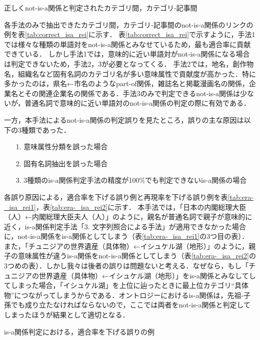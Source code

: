 \documentclass[japanese]{jnlp_1.4}
\begin{document}
\begin{table}[b]
\caption{正しくnot-is-a関係と判定されたカテゴリ間，カテゴリ‐記事間}
\label{tab:correct_isa_rei}

\vspace{-1\Cvs}
\end{table}

各手法のみで抽出できたカテゴリ間，カテゴリ‐記事間のnot-is-a関係のリンクの例を表\ref{tab:correct_isa_rei}に示す．
表\ref{tab:correct_isa_rei}で示すように，手法1では様々な種類の単語対をnot-is-a関係とみなせているため，最も適合率に貢献できている．
しかし手法1では，意味的に近い単語対がnot-is-a関係になる場合は判定できないため，手法2，3が必要となってくる．
手法2では，地名，創作物名，組織名など固有名詞のカテゴリ名が多い意味属性で貢献度が高かった．特に多かったのは，県名←市名のようなpart-of関係，雑誌名と掲載漫画名の関係，企業名とその関連企業名の関係である．手法3のみで判定できるnot-is-a関係は少ないが，普通名詞で意味的に近い単語対のnot-is-a関係の判定の際に有効である．

一方，本手法によるnot-is-a関係の判定誤りを見たところ，誤りの主な原因は以下の3種類であった．
\begin{itemize}
\item[1.]
意味属性分類を誤った場合
\item[2.]
固有名詞抽出を誤った場合
\item[3.]
3種類のis-a関係判定手法の精度が100\%でも判定できないis-a関係の場合
\end{itemize}

\noindent
各誤り原因による，適合率を下げる誤り例と再現率を下げる誤り例を表\ref{tab:era-_isa_rei1}，表\ref{tab:era-_isa_rei2}に示す．
本手法では，「日本の内閣総理大臣（人）←内閣総理大臣夫人（人）」のように，親名が普通名詞で親子が意味的に近く，is-a関係判定手法「3. 文字列照合による手法」が適用できなかった場合に，not-is-a関係をis-a関係としてしまう（表\ref{tab:era-_isa_rei1}の3つ目の表）．
また，「チュニジアの世界遺産（具体物）←イシュケル湖（地形）」のように，親子の意味属性が違うis-a関係をnot-is-a関係としてしまう（表\ref{tab:era-_isa_rei2}の3つめの表）．しかし我々は後者の誤りは問題ないと考える．なぜなら，もし「チュニジアの世界遺産（具体物）←イシュケル湖（地形）」をis-a関係とみなしてしてしまった場合，「イシュケル湖」を上位に辿ったときに最上位カテゴリ``具体物''につながってしまうからである．オントロジーにおけるis-a関係は，先祖‐子孫でも成り立たなければならないので，ここでは両者をnot-is-a関係と判定してしまったほうが結果として適切となる．

\begin{table}[t]
\caption{is-a関係判定における，適合率を下げる誤りの例}
\label{tab:era-_isa_rei1}

\end{table}
\end{document}
